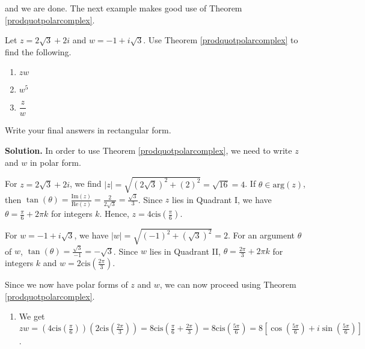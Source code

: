 \documentclass{ximera}
\begin{document}
and we are done.  The next example makes good use of Theorem \ref{prodquotpolarcomplex}.


\begin{example}  \label{polararithmeticex} Let $z = 2\sqrt{3} + 2i$ and $w = -1 + i\sqrt{3}$.  Use Theorem \ref{prodquotpolarcomplex} to find the following.

\begin{multicols}{3}

\begin{enumerate}

\item $zw$

\item  $w^5$

\item $\dfrac{z}{w}$

\end{enumerate}

\end{multicols}

Write your final answers in rectangular form.

\medskip

{\bf Solution.}  In order to use Theorem \ref{prodquotpolarcomplex}, we need to write $z$ and $w$ in polar form.

\smallskip

  For $z=2\sqrt{3} + 2i$, we find $|z| = \sqrt{(2\sqrt{3})^2 + (2)^2} = \sqrt{16} = 4$.  If $\theta \in \text{arg}(z)$, then  $\tan(\theta) = \frac{\text{Im}(z)}{\text{Re}(z)} = \frac{2}{2\sqrt{3}} = \frac{\sqrt{3}}{3}$.  Since $z$ lies in Quadrant I, we have $\theta = \frac{\pi}{6} + 2\pi k$ for integers $k$.  Hence, $z = 4 \text{cis}\left(\frac{\pi}{6}\right)$. 
  
  \smallskip
  
  For $w = -1 + i\sqrt{3}$, we have $|w| = \sqrt{(-1)^2+(\sqrt{3})^2} = 2$.  For an argument $\theta$ of $w$,  $\tan(\theta) = \frac{\sqrt{3}}{-1} = -\sqrt{3}$.  Since $w$ lies in Quadrant II,  $\theta = \frac{2\pi}{3} + 2\pi k$ for integers $k$ and $w = 2\text{cis}\left(\frac{2\pi}{3}\right)$.  
  
  \smallskip
  
  Since we now have polar forms of $z$ and $w$, we can now proceed using Theorem \ref{prodquotpolarcomplex}.
  
  \begin{enumerate}

\item  We get $zw = \left(4 \text{cis}\left(\frac{\pi}{6}\right)\right) \left(2\text{cis}\left(\frac{2\pi}{3}\right)\right) = 8\text{cis}\left(\frac{\pi}{6} + \frac{2\pi}{3}\right) = 8\text{cis}\left(\frac{5\pi}{6}\right) = 8\left[ \cos\left(\frac{5\pi}{6}\right) + i\sin\left(\frac{5\pi}{6}\right) \right]$. 


\end{enumerate}
\end{example}
\end{document}
